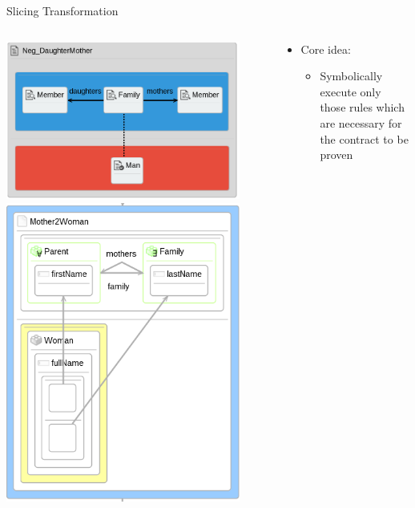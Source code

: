 \documentclass[12pt, handout]{beamer}
\begin{document}
\begin{frame}{Slicing Transformation}
\begin{columns}[T] %
     \begin{column}[T]{0.45\textwidth} %
\includegraphics[width=0.9\textwidth]{figures/Pos_DaughterMother} \newline
\includegraphics[width=0.9\textwidth]{figures/Mother2Woman}
 \end{column}
     \begin{column}[T]{0.55\textwidth}
     \begin{itemize}[<+->]
\item Core idea:
\begin{itemize}[<+->]
\item Symbolically execute only those rules which are necessary for the contract to be proven


\end{itemize}
\end{itemize}
\end{column}
\end{columns}
\end{frame}
\end{document}
